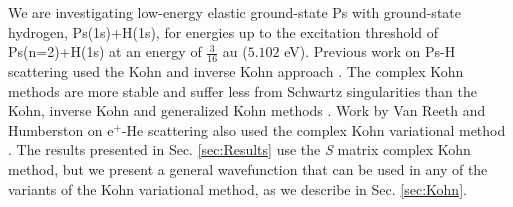 \documentclass[preprint,showpacs,preprintnumbers,amsmath,amssymb,longbibliography,pra,aps]{revtex4-1}
\begin{document}
We are investigating low-energy elastic ground-state Ps with ground-state hydrogen, Ps(1s)+H(1s), for energies up to the excitation threshold of Ps(n=2)+H(1s) at an energy of $\tfrac{3}{16}$ au ($5.102$ eV). Previous work on Ps-H scattering used the Kohn and inverse Kohn approach \cite{VanReeth2003, VanReeth2004}. The complex Kohn methods are more stable and suffer less from Schwartz singularities than the Kohn, inverse Kohn and generalized Kohn methods \cite{Lucchese1989,Cooper2009,Cooper2010}. Work by Van Reeth and Humberston on e$^+$-He scattering also used the complex Kohn variational method \cite{VanReeth1999}. The results presented in Sec. \ref{sec:Results} use the \emph{S} matrix complex Kohn method, but we present a general wavefunction that can be used in any of the variants of the Kohn variational method, as we describe in Sec. \ref{sec:Kohn}.
\end{document}
